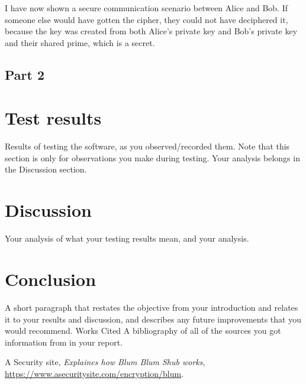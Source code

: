\documentclass[12pt, letterpaper]{article}
\begin{document}
I have now shown a secure communication scenario between Alice and Bob. If someone else would have gotten the cipher, they could not have deciphered it, because the key was created from both Alice's private key and Bob's private key and their shared prime, which is a secret. 

\subsection*{Part 2}


\section*{Test results}
Results of testing the software, as you observed/recorded them. Note that this section is only for
observations you make during testing. Your analysis belongs in the Discussion section.

\section*{Discussion}
Your analysis of what your testing results mean, and your analysis.

\section*{Conclusion}
A short paragraph that restates the objective from your introduction and relates it to your results
and discussion, and describes any future improvements that you would recommend. Works Cited A
bibliography of all of the sources you got information from in your report.

\newpage
\begin{thebibliography}{10} 
 A Security site,  \emph{Explaines how Blum Blum Shub works},
\url{https://www.asecuritysite.com/encryption/blum}.
\end{thebibliography}
\end{document}
